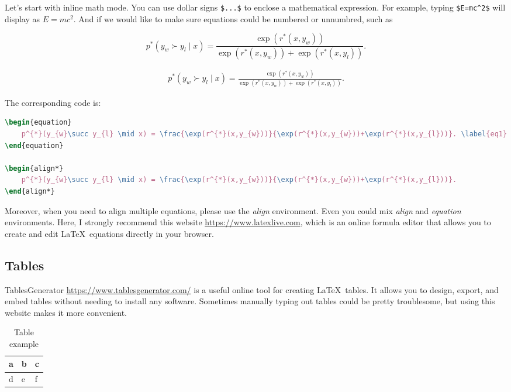 Let's start with inline math mode. You can use dollar signs \texttt{\$...\$} to enclose a mathematical expression. For example, typing \texttt{\$E=mc\^{}2\$} will display as $E=mc^2$. And if we would like to make sure equations could be numbered or unnumbred, such as 

\begin{equation}
    p^{*}(y_{w}\succ y_{l} \mid x) = \frac{\exp(r^{*}(x,y_{w}))}{\exp(r^{*}(x,y_{w}))+\exp(r^{*}(x,y_{l}))}. \label{eq1}
\end{equation}

\begin{align*}
    p^{*}(y_{w}\succ y_{l} \mid x) = \frac{\exp(r^{*}(x,y_{w}))}{\exp(r^{*}(x,y_{w}))+\exp(r^{*}(x,y_{l}))}. 
\end{align*}

The corresponding code is:
\begin{lstlisting}[language=TeX]
\begin{equation}
    p^{*}(y_{w}\succ y_{l} \mid x) = \frac{\exp(r^{*}(x,y_{w}))}{\exp(r^{*}(x,y_{w}))+\exp(r^{*}(x,y_{l}))}. \label{eq1}
\end{equation}

\begin{align*}
    p^{*}(y_{w}\succ y_{l} \mid x) = \frac{\exp(r^{*}(x,y_{w}))}{\exp(r^{*}(x,y_{w}))+\exp(r^{*}(x,y_{l}))}. 
\end{align*}
\end{lstlisting}

Moreover, when you need to align multiple equations, please use the \textit{align} environment. Even you could mix \textit{align} and \textit{equation} environments. Here, I strongly recommend this website \url{https://www.latexlive.com}, which is an online formula editor that allows you to create and edit \LaTeX\ equations directly in your browser.


\subsection*{Tables}
TablesGenerator \url{https://www.tablesgenerator.com/} is a useful online tool for creating \LaTeX\ tables. It allows you to design, export, and embed tables without needing to install any software. Sometimes manually typing out tables could be pretty troublesome, but using this website makes it more convenient.

\begin{table}[h!]
\centering
\begin{tabular}{|l|l|l|}
\hline
a & b & c \\ \hline
d & e & f \\ \hline
\end{tabular}
\caption{Table example}
\label{tab1}
\end{table}

